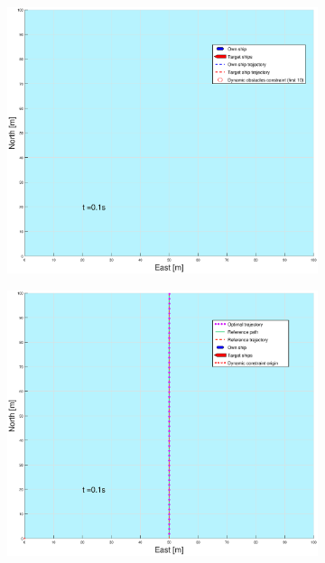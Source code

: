 \clearpage
\begin{figure}[!b]
    \begin{subfigure}[b]{0.49\textwidth}
        \centering
        \includegraphics[width=\textwidth]{Images/Figures/enkel_SO/_Simple_0fig1_time=0}
    \end{subfigure}
    \hfill
    \begin{subfigure}[b]{0.499\textwidth}
        \centering
        \includegraphics[width=\textwidth]{Images/Figures/enkel_SO/_Simple_0fig999_time=0}

\end{subfigure}
\end{figure}
